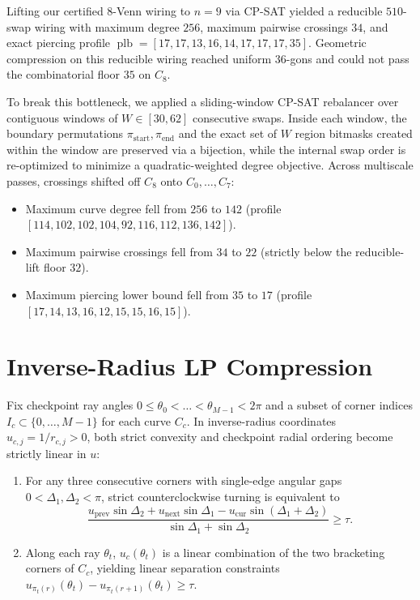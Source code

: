 \documentclass[11pt]{article}
\begin{document}
Lifting our certified $8$-Venn wiring to $n=9$ via CP-SAT yielded a reducible $510$-swap wiring with maximum degree $256$, maximum pairwise crossings $34$, and exact piercing profile $\operatorname{plb} = [17, 17, 13, 16, 14, 17, 17, 17, 35]$. Geometric compression on this reducible wiring reached uniform $36$-gons and could not pass the combinatorial floor $35$ on $C_8$.

To break this bottleneck, we applied a sliding-window CP-SAT rebalancer over contiguous windows of $W \in [30, 62]$ consecutive swaps. Inside each window, the boundary permutations $\pi_{\text{start}}, \pi_{\text{end}}$ and the exact set of $W$ region bitmasks created within the window are preserved via a bijection, while the internal swap order is re-optimized to minimize a quadratic-weighted degree objective. Across multiscale passes, crossings shifted off $C_8$ onto $C_0, \dots, C_7$:
\begin{itemize}
\item Maximum curve degree fell from $256$ to $142$ (profile $[114, 102, 102, 104, 92, 116, 112, 136, 142]$).
\item Maximum pairwise crossings fell from $34$ to $22$ (strictly below the reducible-lift floor $32$).
\item Maximum piercing lower bound fell from $35$ to $17$ (profile $[17, 14, 13, 16, 12, 15, 15, 16, 15]$).
\end{itemize}

\section{Inverse-Radius LP Compression}

Fix checkpoint ray angles $0 \le \theta_0 < \dots < \theta_{M-1} < 2\pi$ and a subset of corner indices $I_c \subset \{0, \dots, M-1\}$ for each curve $C_c$. In inverse-radius coordinates $u_{c,j} = 1 / r_{c,j} > 0$, both strict convexity and checkpoint radial ordering become strictly linear in $u$:
\begin{enumerate}
\item For any three consecutive corners with single-edge angular gaps $0 < \Delta_1, \Delta_2 < \pi$, strict counterclockwise turning is equivalent to
\[
\frac{u_{\text{prev}} \sin\Delta_2 + u_{\text{next}} \sin\Delta_1 - u_{\text{cur}} \sin(\Delta_1 + \Delta_2)}{\sin\Delta_1 + \sin\Delta_2} \ge \tau.
\]
\item Along each ray $\theta_t$, $u_c(\theta_t)$ is a linear combination of the two bracketing corners of $C_c$, yielding linear separation constraints $u_{\pi_t(r)}(\theta_t) - u_{\pi_t(r+1)}(\theta_t) \ge \tau$.
\end{enumerate}
\end{document}
